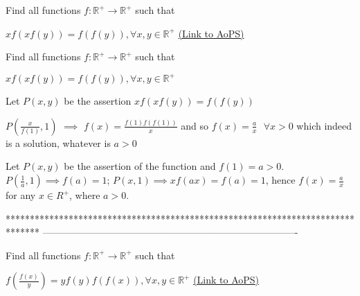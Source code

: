 \begin{problem}
	Find all functions $f:\mathbb{R}^{+}\rightarrow \mathbb{R}^{+}  $ such that

$xf\left ( xf(y) \right )=f(f(y)),\forall x,y\in \mathbb{R}^{+}$
	\flushright \href{https://artofproblemsolving.com/community/c6h618333}{(Link to AoPS)}
\end{problem}



\begin{solution}
	\begin{tcolorbox}Find all functions $f:\mathbb{R}^{+}\rightarrow \mathbb{R}^{+}  $ such that

$xf\left ( xf(y) \right )=f(f(y)),\forall x,y\in \mathbb{R}^{+}$\end{tcolorbox}

Let $P(x,y)$ be the assertion $xf(xf(y))=f(f(y))$

$P(\frac x{f(1)},1)$ $\implies$ $f(x)=\frac{f(1)f(f(1))}x$ and so $\boxed{f(x)=\frac ax\text{  }\forall x>0}$ which indeed is a solution, whatever is $a>0$
\end{solution}



\begin{solution}
	Let $ P(x,y) $ be the assertion of the function and $ f(1)=a>0 $.
$ P(\frac{1}{a}, 1) \implies  f(a)=1 $;
$ P(x,1) \implies xf(ax)=f(a)=1 $, hence $ f(x)=\frac{a}{x} $ for any $ x \in R^{+} $, where $ a>0 $.
\end{solution}
*******************************************************************************
-------------------------------------------------------------------------------

\begin{problem}
	Find all functions $f:\mathbb{R}^{+}\rightarrow \mathbb{R}^{+}  $ such that

$ f\left ( \frac{f(x)}{y} \right )=yf(y)f(f(x))  ,\forall x,y\in \mathbb{R}^{+}$
	\flushright \href{https://artofproblemsolving.com/community/c6h618334}{(Link to AoPS)}
\end{problem}



